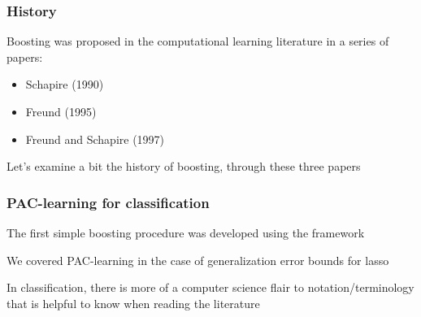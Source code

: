\documentclass[12pt]{beamer}
\date{}
\begin{document}
\title{}
\subtitle{\classTitle}

\begin{frame}
\maketitle
%
\organization
%
\end{frame}


\begin{frame}[fragile]
\frametitle{History}
Boosting was proposed in the computational learning literature in a series of papers:
\begin{itemize}
\item Schapire (1990)
\item Freund (1995)
\item Freund and Schapire (1997)
\end{itemize}

Let's examine a bit the history of boosting, through these three papers
\end{frame}

\begin{frame}[fragile]
\frametitle{PAC-learning for classification}
The first simple boosting procedure was developed using the  framework

\vsp
We covered PAC-learning in the case of generalization error bounds for lasso

\vsp
In classification, there is more of a computer science flair to notation/terminology that is helpful to know
when reading the literature
\end{frame}
\end{document}
